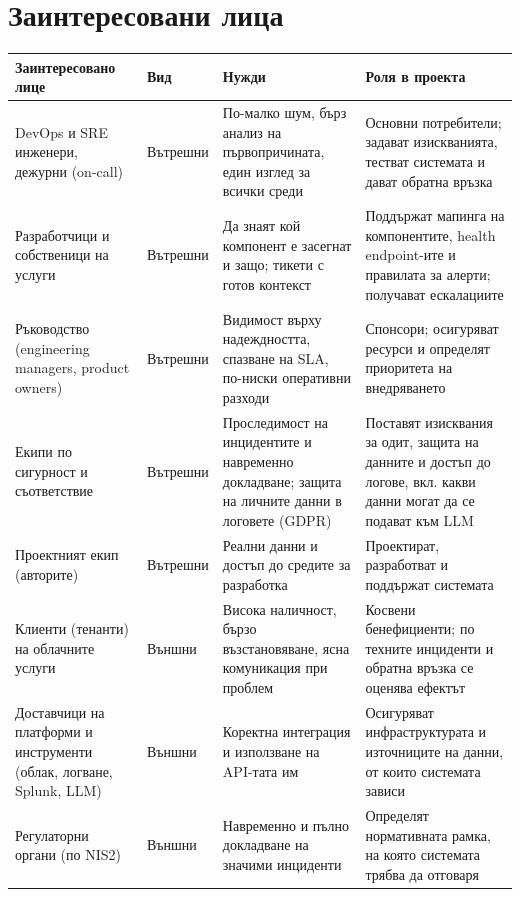 \documentclass[11pt,a4paper]{article}
\begin{document}
\section{Заинтересовани лица}

\small
\begin{tabularx}{\textwidth}{@{}>{\raggedright\arraybackslash}p{3.2cm}p{2.1cm}LL@{}}
\toprule
\textbf{Заинтересовано лице} & \textbf{Вид} & \textbf{Нужди} & \textbf{Роля в проекта} \\
\midrule
DevOps и SRE инженери, дежурни (on-call) & Вътрешни &
По-малко шум, бърз анализ на първопричината, един изглед за всички среди &
Основни потребители; задават изискванията, тестват системата и дават обратна връзка \\
\addlinespace[2pt]
Разработчици и собственици на услуги & Вътрешни &
Да знаят кой компонент е засегнат и защо; тикети с готов контекст &
Поддържат мапинга на компонентите, health endpoint-ите и правилата за алерти; получават ескалациите \\
\addlinespace[2pt]
Ръководство (engineering managers, product owners) & Вътрешни &
Видимост върху надеждността, спазване на SLA, по-ниски оперативни разходи &
Спонсори; осигуряват ресурси и определят приоритета на внедряването \\
\addlinespace[2pt]
Екипи по сигурност и съответствие & Вътрешни &
Проследимост на инцидентите и навременно докладване; защита на личните данни в логовете (GDPR) &
Поставят изисквания за одит, защита на данните и достъп до логове, вкл. какви данни могат да се подават към LLM \\
\addlinespace[2pt]
Проектният екип (авторите) & Вътрешни &
Реални данни и достъп до средите за разработка &
Проектират, разработват и поддържат системата \\
\addlinespace[2pt]
Клиенти (тенанти) на облачните услуги & Външни &
Висока наличност, бързо възстановяване, ясна комуникация при проблем &
Косвени бенефициенти; по техните инциденти и обратна връзка се оценява ефектът \\
\addlinespace[2pt]
Доставчици на платформи и инструменти (облак, логване, Splunk, LLM) & Външни &
Коректна интеграция и използване на API-тата им &
Осигуряват инфраструктурата и източниците на данни, от които системата зависи \\
\addlinespace[2pt]
Регулаторни органи (по NIS2) & Външни &
Навременно и пълно докладване на значими инциденти &
Определят нормативната рамка, на която системата трябва да отговаря \\
\bottomrule
\end{tabularx}
\normalsize
\end{document}
